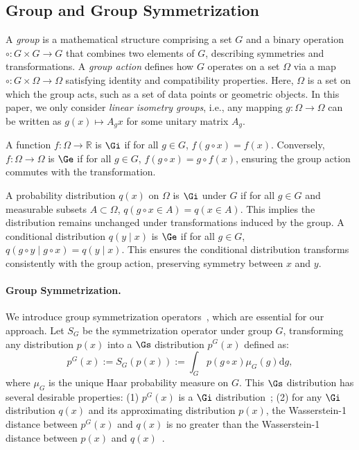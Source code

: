 \subsection{Group and Group Symmetrization}

A \emph{group} is a mathematical structure comprising a set \( G \) and a binary operation \( \circ : G \times G \to G \) that combines two elements of \( G \), describing symmetries and transformations. A \emph{group action} defines how \( G \) operates on a set \( \Omega \) via a map \( \circ : G \times \Omega \to \Omega \) satisfying identity and compatibility properties. Here, \( \Omega \) is a set on which the group acts, such as a set of data points or geometric objects. In this paper, we only consider \textit{linear isometry groups}, i.e., any mapping \( g : \Omega \to \Omega \) can be written as \( g(x) \mapsto A_gx \) for some unitary matrix $A_g$. 

A function \( f : \Omega \to \mathbb{R} \) is \(\Gi\) if for all \( g \in G \), \( f(g \circ x) = f(x) \). Conversely, \( f : \Omega \to \Omega \) is \(\Ge\) if for all \( g \in G \), \( f(g \circ x) = g \circ f(x) \), ensuring the group action commutes with the transformation.

A probability distribution \( q(x) \) on \( \Omega \) is \(\Gi\) under \( G \) if for all \( g \in G \) and measurable subsets \( A \subset \Omega \), \( q(g \circ x \in A) = q(x \in A) \). This implies the distribution remains unchanged under transformations induced by the group. A conditional distribution \( q(y \mid x) \) is \(\Ge\) if for all \( g \in G \), \( q(g \circ y \mid g \circ x) = q(y \mid x) \). This ensures the conditional distribution transforms consistently with the group action, preserving symmetry between \( x \) and \( y \).


\paragraph{Group Symmetrization.}  
We introduce group symmetrization operators~, which are essential for our approach. Let \( S_G \) be the symmetrization operator under group \( G \), transforming any distribution \( p(x) \) into a \(\Gs\) distribution \( p^G(x) \) defined as:
\begin{equation}
    p^G(x) := S_G(p(x)) := \int_G p(g \circ x) \mu_G(g) \mathrm{d}g, \nonumber
\end{equation}
where \( \mu_G \) is the unique Haar probability measure on \( G \). This \(\Gs\) distribution has several desirable properties: (1) \( p^G(x) \) is a \(\Gi\) distribution~; (2) for any \(\Gi\) distribution \( q(x) \) and its approximating distribution \( p(x) \), the Wasserstein-1 distance between \(p^G(x)\) and \( q(x) \) is no greater than the Wasserstein-1 distance between \( p(x) \) and \( q(x) \)~.

